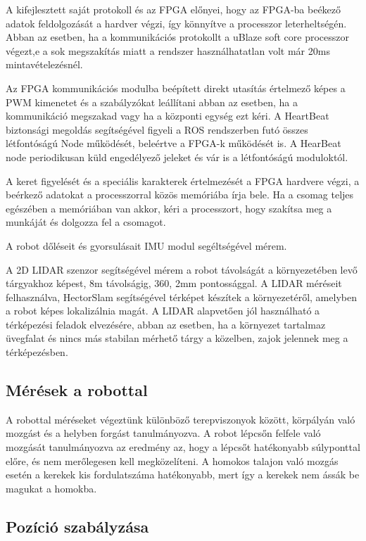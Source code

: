\begin{titlepage}
A kifejlesztett saját protokoll és az FPGA előnyei, hogy az FPGA-ba beékező adatok feldolgozását a hardver végzi, így könnyítve a processzor leterheltségén. Abban az esetben, ha a kommunikációs protokollt a uBlaze soft core processzor végezt,e a sok megszakítás miatt a rendszer használhatatlan volt már 20ms mintavételezésnél.

Az FPGA kommunikációs modulba beépített direkt utasítás értelmező képes a PWM kimenetet és a szabályzókat leállítani abban az esetben, ha a kommunikáció megszakad vagy ha a központi egység ezt kéri.
A HeartBeat biztonsági megoldás segítségével figyeli a ROS rendszerben futó összes létfontóságú Node működését, beleértve a FPGA-k működését is. A HearBeat node periodikusan küld engedélyező jeleket és vár is a létfontóságú moduloktól.

A keret figyelését és a speciális karakterek értelmezését a FPGA  hardvere végzi, a beérkező adatokat a processzorral közös memóriába írja bele. Ha a csomag teljes egészében a memóriában van akkor, kéri a processzort, hogy szakítsa meg a munkáját és dolgozza fel a csomagot.






 A robot dőléseit és gyorsulásait IMU modul segéltségével mérem.

A 2D LIDAR szenzor segítségével mérem a robot távolságát a környezetében levő tárgyakhoz képest, 8m távolságig, 360\degree, 2mm pontossággal. A LIDAR méréseit felhasználva, HectorSlam segítségével térképet készítek a környezetéről, amelyben a robot képes lokalizálnia magát.
A LIDAR alapvetően jól használható a térképezési feladok elvezésére, abban az esetben, ha a környezet tartalmaz üvegfalat és nincs más stabilan mérhető tárgy a közelben, zajok jelennek meg a térképezésben. 

\subsection*{Mérések a robottal}

A robottal méréseket végeztünk különböző terepviszonyok között, körpályán való mozgást és a helyben forgást tanulmányozva. A robot lépcsőn felfele való mozgását tanulmányozva az eredmény az, hogy a lépcsőt hatékonyabb súlyponttal előre, és nem merőlegesen kell megközelíteni. A homokos talajon való mozgás esetén a kerekek kis fordulatszáma hatékonyabb, mert így a kerekek nem ássák be magukat a homokba. 



\subsection*{Pozíció szabályzása}


\end{titlepage}
